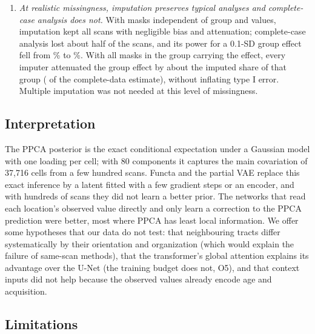 \documentclass[11pt]{article}
\begin{document}
\begin{enumerate}
(\rmThreeShareADef) through a minority of poorly imputed scans, and was clearly worse than the norm when most of a scan
was hidden; for a large multi-site cohort the transformer is the safer choice.
\item \emph{At realistic missingness, imputation preserves typical analyses and complete-case analysis does not.}
With masks independent of group and values, imputation kept all scans with negligible bias and attenuation; complete-case
analysis lost about half of the scans, and its power for a 0.1-SD group effect fell from \efSmallFullPower\% to
\efSmallCcPower\%. With all masks in the group carrying the effect, every imputer attenuated the group effect by about the
imputed share of that group (\efDiffBlendRelfull{} of the complete-data estimate), without inflating type I error.
Multiple imputation was not needed at this level of missingness.
\end{enumerate}

\subsection{Interpretation}

The PPCA posterior is the exact conditional expectation under a Gaussian model with one loading per cell; with 80
components it captures the main covariation of 37,716 cells from a few hundred scans. Functa and the partial VAE
replace this exact inference by a latent fitted with a few gradient steps or an encoder, and with hundreds of scans they
did not learn a better prior. The networks that read each location's observed value directly and only learn a
correction to the PPCA prediction were better, most where PPCA has least local information. We offer some hypotheses
that our data do not test: that neighbouring tracts differ systematically by their orientation and organization (which
would explain the failure of same-scan methods), that the transformer's global attention explains its advantage over the U-Net (the training budget does not, O5), and that context inputs did not help because the observed values already
encode age and acquisition.

\subsection{Limitations}
\end{document}
